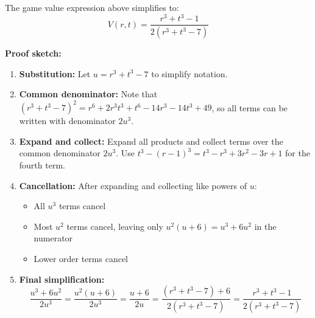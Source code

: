 \documentclass[../../main/main.tex]{subfiles}
\providecommand{\tightlist}{%
      \setlength{\itemsep}{0pt}\setlength{\parskip}{0pt}}
\begin{document}
The game value expression above simplifies to:
\[V(r,t) = \frac{r^3 + t^3 - 1}{2(r^3 + t^3 - 7)}\]

\textbf{Proof sketch:}

\begin{enumerate}
\def\labelenumi{\arabic{enumi}.}
\item
  \textbf{Substitution:} Let \(u = r^3 + t^3 - 7\) to simplify notation.
\item
  \textbf{Common denominator:} Note that
  \((r^3 + t^3 - 7)^2 = r^6 + 2r^3t^3 + t^6 - 14r^3 - 14t^3 + 49\), so
  all terms can be written with denominator \(2u^3\).
\item
  \textbf{Expand and collect:} Expand all products and collect terms
  over the common denominator \(2u^3\). Use
  \(t^3 - (r-1)^3 = t^3 - r^3 + 3r^2 - 3r + 1\) for the fourth term.
\item
  \textbf{Cancellation:} After expanding and collecting like powers of
  \(u\):

  \begin{itemize}
  \tightlist
  \item
    All \(u^3\) terms cancel
  \item
    Most \(u^2\) terms cancel, leaving only \(u^2(u + 6) = u^3 + 6u^2\)
    in the numerator
  \item
    Lower order terms cancel
  \end{itemize}
\item
  \textbf{Final simplification:}
  \[\frac{u^3 + 6u^2}{2u^3} = \frac{u^2(u + 6)}{2u^3} = \frac{u + 6}{2u} = \frac{(r^3 + t^3 - 7) + 6}{2(r^3 + t^3 - 7)} = \frac{r^3 + t^3 - 1}{2(r^3 + t^3 - 7)}\]
\end{enumerate}
\end{document}
